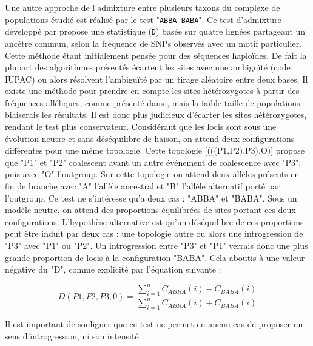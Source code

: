 Une autre approche de l'admixture entre plusieurs taxons du complexe de populations étudié est réalisé par le test "\verb|ABBA-BABA|". 
Ce test d'admixture développé par \citet{Durand2011} propose une statistique (\verb|D|) basée sur quatre lignées partageant un ancêtre commun, selon la fréquence de SNPs observés avec un motif particulier.
Cette méthode étant initialement pensée pour des séquences haploïdes. 
De fait la plupart des algorithmes présentés écartent les sites avec une ambiguïté (code IUPAC) ou alors résolvent l’ambiguïté par un tirage aléatoire entre deux bases.
Il existe une méthode pour prendre en compte les sites hétérozygotes à partir des fréquences alléliques, comme présenté dans \citet{Durand2011}, mais la faible taille de populations biaiserais les résultats. Il est donc plus judicieux d'écarter les sites hétérozygotes, rendant le test plus conservateur.
Considérant que les locis sont sous une évolution neutre et sans déséquilibre de liaison, on attend deux configurations différentes pour une même topologie. 
Cette topologie [(((P1,P2),P3),O)] propose que "P1" et "P2" coalescent avant un autre événement de coalescence avec "P3", puis avec "O" l'outgroup.
Sur cette topologie on attend deux allèles présents en fin de branche avec "A" l'allèle ancestral et "B" l'allèle alternatif porté par l'outgroup.
Ce test ne s'intéresse qu'a deux cas : "ABBA" et "BABA".
Sous un modèle neutre, on attend des proportions équilibrées de sites portant ces deux configurations.
L'hypothèse alternative est qu'un déséquilibre de ces proportions peut être induit par deux cas : une topologie autre ou alors une introgression de "P3" avec "P1" ou "P2".
Un introgression entre "P3" et "P1" verrais donc une plus grande proportion de locis à la configuration "BABA". 
Cela aboutis à une valeur négative du "D", comme explicité par l'équation suivante :

\[D(P1,P2,P3,0)=\frac{\sum_{i=1}^{n} C_{ABBA}(i)-C_{BABA}(i)}{\sum_{i=1}^{n} C_{ABBA}(i)+C_{BABA}(i)}\]

Il est important de souligner que ce test ne permet en aucun cas de proposer un sens d'introgression, ni son intensité.

